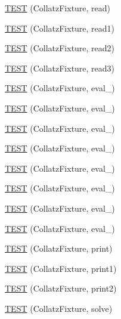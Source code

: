 \begin{DoxyCompactItemize}
\item 
\hyperlink{TestCollatz_8c_09_09_a528303af22c7c5a550af7342092a9f05}{T\-E\-S\-T} (Collatz\-Fixture, read)
\item 
\hyperlink{TestCollatz_8c_09_09_a86061488c66d6ec3993858a2fbc36b0f}{T\-E\-S\-T} (Collatz\-Fixture, read1)
\item 
\hyperlink{TestCollatz_8c_09_09_ab878f3675d378e526be517f391de93fa}{T\-E\-S\-T} (Collatz\-Fixture, read2)
\item 
\hyperlink{TestCollatz_8c_09_09_ae01e053db02b2e24bc79f2e52531cc59}{T\-E\-S\-T} (Collatz\-Fixture, read3)
\item 
\hyperlink{TestCollatz_8c_09_09_aa0fcdadaf0d4f7fe0919c37746fe7c74}{T\-E\-S\-T} (Collatz\-Fixture, eval\-\_)
\item 
\hyperlink{TestCollatz_8c_09_09_a333bb6921f06fa177e9818dbcf3eda06}{T\-E\-S\-T} (Collatz\-Fixture, eval\-\_)
\item 
\hyperlink{TestCollatz_8c_09_09_a251001c75c1226c607534268ab3a5bcb}{T\-E\-S\-T} (Collatz\-Fixture, eval\-\_)
\item 
\hyperlink{TestCollatz_8c_09_09_a033aa388470c35adc9579303dba1afa2}{T\-E\-S\-T} (Collatz\-Fixture, eval\-\_)
\item 
\hyperlink{TestCollatz_8c_09_09_ab529bbfe532bd0b6fbc11c51fe0af7e5}{T\-E\-S\-T} (Collatz\-Fixture, eval\-\_)
\item 
\hyperlink{TestCollatz_8c_09_09_adebb7237f2a00c256cd0c733885ccd58}{T\-E\-S\-T} (Collatz\-Fixture, eval\-\_)
\item 
\hyperlink{TestCollatz_8c_09_09_a4428eb890eb2825bcd806812ccf3edc3}{T\-E\-S\-T} (Collatz\-Fixture, eval\-\_)
\item 
\hyperlink{TestCollatz_8c_09_09_a2e12d9c89f94e5227e499d7703f9dfaa}{T\-E\-S\-T} (Collatz\-Fixture, eval\-\_)
\item 
\hyperlink{TestCollatz_8c_09_09_a1be21485425cf43808a497ed8ef4d418}{T\-E\-S\-T} (Collatz\-Fixture, print)
\item 
\hyperlink{TestCollatz_8c_09_09_a7ff0f20b9076fc1762bec9d580e29238}{T\-E\-S\-T} (Collatz\-Fixture, print1)
\item 
\hyperlink{TestCollatz_8c_09_09_a99f7dd94c98bff5b2e206c364d57e917}{T\-E\-S\-T} (Collatz\-Fixture, print2)
\item 
\hyperlink{TestCollatz_8c_09_09_a07f06cda216730b4038ffd06db5a3d1f}{T\-E\-S\-T} (Collatz\-Fixture, solve)
\end{DoxyCompactItemize}



